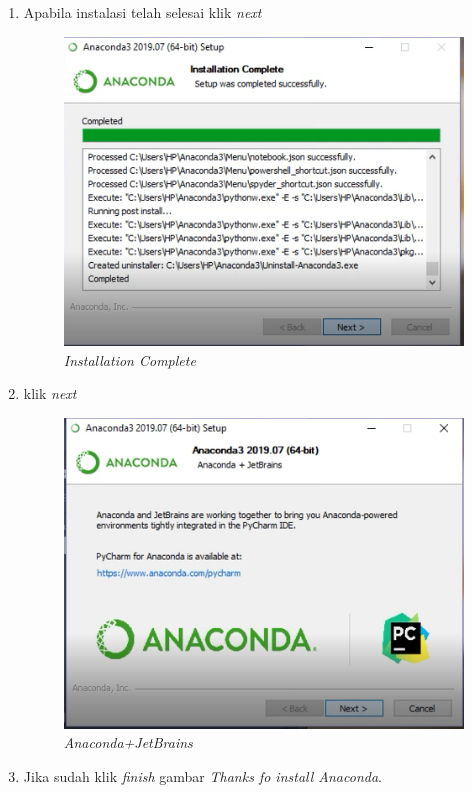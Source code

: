 \begin{enumerate}
\item Apabila instalasi telah selesai klik \textit{next}
\begin{figure}[H]
    \centering
    \includegraphics[scale=0.5]{figures/9}
    \caption{\textit{Installation Complete}}
    \label{Figureanaconda8}
\end{figure}

\item klik \textit{next}
\begin{figure}[H]
    \centering
    \includegraphics[scale=0.5]{figures/10}
    \caption{\textit{Anaconda+JetBrains}}
    \label{Figureanaconda70}
\end{figure}

\item Jika sudah klik \textit{finish}
 gambar \textit{Thanks fo install Anaconda}.


\end{enumerate}
